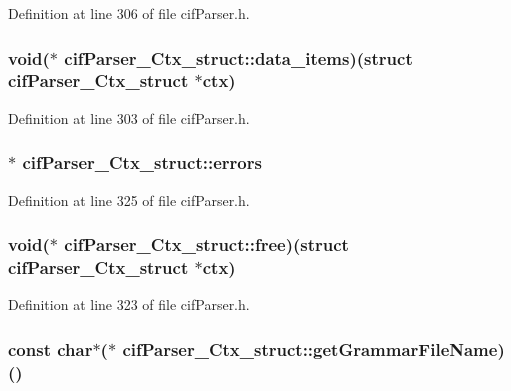 Definition at line 306 of file cif\-Parser.\-h.

\hypertarget{structcif_parser___ctx__struct_a74c6a5f9c1b64c5c4c5bfc4b0dc4b0dc}{
\subsubsection[{data\-\_\-items}]{\setlength{\rightskip}{0pt plus 5cm}void($\ast$ cif\-Parser\-\_\-\-Ctx\-\_\-struct\-::data\-\_\-items)(struct {\bf cif\-Parser\-\_\-\-Ctx\-\_\-struct} $\ast$ctx)}}\label{structcif_parser___ctx__struct_a74c6a5f9c1b64c5c4c5bfc4b0dc4b0dc}


Definition at line 303 of file cif\-Parser.\-h.

\hypertarget{structcif_parser___ctx__struct_ac901a5e77c67a7371bcdb7949f3c8259}{
\subsubsection[{errors}]{$\ast$ cif\-Parser\-\_\-\-Ctx\-\_\-struct\-::errors}}\label{structcif_parser___ctx__struct_ac901a5e77c67a7371bcdb7949f3c8259}


Definition at line 325 of file cif\-Parser.\-h.

\hypertarget{structcif_parser___ctx__struct_adbb9ccde473caa5084de42bf8a74d52f}{
\subsubsection[{free}]{\setlength{\rightskip}{0pt plus 5cm}void($\ast$ cif\-Parser\-\_\-\-Ctx\-\_\-struct\-::free)(struct {\bf cif\-Parser\-\_\-\-Ctx\-\_\-struct} $\ast$ctx)}}\label{structcif_parser___ctx__struct_adbb9ccde473caa5084de42bf8a74d52f}


Definition at line 323 of file cif\-Parser.\-h.

\hypertarget{structcif_parser___ctx__struct_aefeaa34c1d9c9f571296690ca3a9b8a8}{
\subsubsection[{get\-Grammar\-File\-Name}]{\setlength{\rightskip}{0pt plus 5cm}const char$\ast$($\ast$ cif\-Parser\-\_\-\-Ctx\-\_\-struct\-::get\-Grammar\-File\-Name)()}}\label{structcif_parser___ctx__struct_aefeaa34c1d9c9f571296690ca3a9b8a8}


